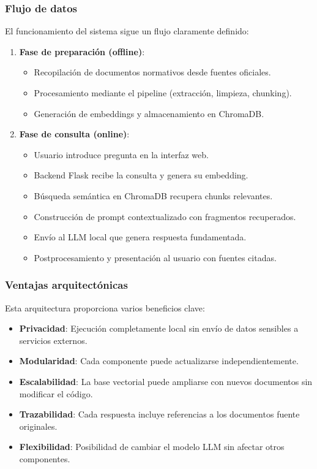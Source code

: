 \documentclass[a4paper,12pt]{article}
\begin{document}
\subsubsection{Flujo de datos}

El funcionamiento del sistema sigue un flujo claramente definido:

\begin{enumerate}
    \item \textbf{Fase de preparación (offline)}:
    \begin{itemize}
        \item Recopilación de documentos normativos desde fuentes oficiales.
        \item Procesamiento mediante el pipeline (extracción, limpieza, chunking).
        \item Generación de embeddings y almacenamiento en ChromaDB.
    \end{itemize}
    
    \item \textbf{Fase de consulta (online)}:
    \begin{itemize}
        \item Usuario introduce pregunta en la interfaz web.
        \item Backend Flask recibe la consulta y genera su embedding.
        \item Búsqueda semántica en ChromaDB recupera chunks relevantes.
        \item Construcción de prompt contextualizado con fragmentos recuperados.
        \item Envío al LLM local que genera respuesta fundamentada.
        \item Postprocesamiento y presentación al usuario con fuentes citadas.
    \end{itemize}
\end{enumerate}

\subsubsection{Ventajas arquitectónicas}

Esta arquitectura proporciona varios beneficios clave:

\begin{itemize}
    \item \textbf{Privacidad}: Ejecución completamente local sin envío de datos sensibles a servicios externos.
    \item \textbf{Modularidad}: Cada componente puede actualizarse independientemente.
    \item \textbf{Escalabilidad}: La base vectorial puede ampliarse con nuevos documentos sin modificar el código.
    \item \textbf{Trazabilidad}: Cada respuesta incluye referencias a los documentos fuente originales.
    \item \textbf{Flexibilidad}: Posibilidad de cambiar el modelo LLM sin afectar otros componentes.
\end{itemize}
\end{document}
